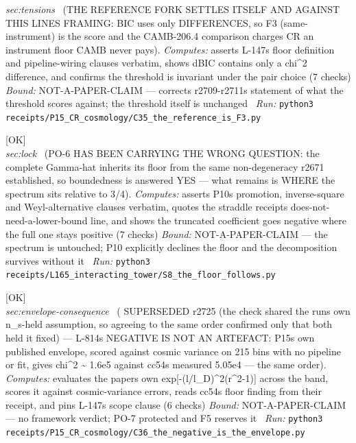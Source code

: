 \begin{description}
\textit{sec:tensions} \ (THE REFERENCE FORK SETTLES ITSELF AND AGAINST THIS LINES FRAMING: BIC uses only DIFFERENCES, so F3 (same-instrument) is the score and the CAMB-206.4 comparison charges CR an instrument floor CAMB never pays). 
\emph{Computes:} asserts L-147s floor definition and pipeline-wiring clauses verbatim, shows dBIC contains only a chi\textasciicircum{}2 difference, and confirms the threshold is invariant under the pair choice (7 checks)
 \emph{Bound:} NOT-A-PAPER-CLAIM --- corrects r2709-r2711s statement of what the threshold scores against; the threshold itself is unchanged
\ \emph{Run:} \texttt{python3 receipts/P15\_CR\_cosmology/C35\_the\_reference\_is\_F3.py}
\item[\label{rcpt:S8_the_floor_follows}\texttt{S8\_the\_floor\_follows}]\hfill\textsf{[OK]}\\
\textit{sec:lock} \ (PO-6 HAS BEEN CARRYING THE WRONG QUESTION: the complete Gamma-hat inherits its floor from the same non-degeneracy r2671 established, so boundedness is answered YES --- what remains is WHERE the spectrum sits relative to 3/4). 
\emph{Computes:} asserts P10s promotion, inverse-square and Weyl-alternative clauses verbatim, quotes the straddle receipts does-not-need-a-lower-bound line, and shows the truncated coefficient goes negative where the full one stays positive (7 checks)
 \emph{Bound:} NOT-A-PAPER-CLAIM --- the spectrum is untouched; P10 explicitly declines the floor and the decomposition survives without it
\ \emph{Run:} \texttt{python3 receipts/L165\_interacting\_tower/S8\_the\_floor\_follows.py}
\item[\label{rcpt:C36_the_negative_is_the_envelope}\texttt{C36\_the\_negative\_is\_the\_envelope}]\hfill\textsf{[OK]}\\
\textit{sec:envelope-consequence} \ ( SUPERSEDED r2725 (the check shared the runs own n\_s-held assumption, so agreeing to the same order confirmed only that both held it fixed) --- L-814s NEGATIVE IS NOT AN ARTEFACT: P15s own published envelope, scored against cosmic variance on 215 bins with no pipeline or fit, gives chi\textasciicircum{}2 \textasciitilde{} 1.6e5 against cc54s measured 5.05e4 --- the same order). 
\emph{Computes:} evaluates the papers own exp[-(l/l\_D)\textasciicircum{}2(r\textasciicircum{}2-1)] across the band, scores it against cosmic-variance errors, reads cc54s floor finding from their receipt, and pins L-147s scope clause (6 checks)
 \emph{Bound:} NOT-A-PAPER-CLAIM --- no framework verdict; PO-7 protected and F5 reserves it
\ \emph{Run:} \texttt{python3 receipts/P15\_CR\_cosmology/C36\_the\_negative\_is\_the\_envelope.py}

\end{description}
